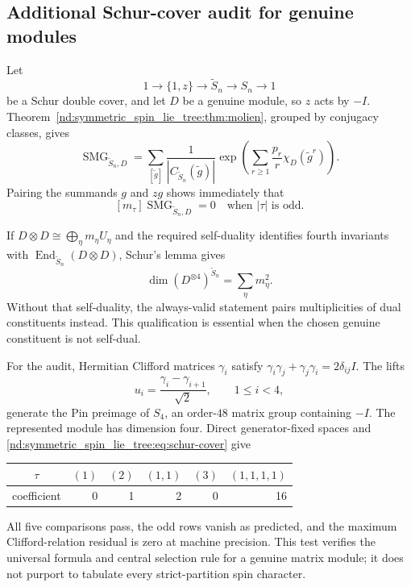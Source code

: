 \documentclass[10pt]{article}
\newcommand{\SMG}{\operatorname{SMG}}
\newcommand{\MGF}{\SMG}
\begin{document}
\subsection{Additional Schur-cover audit for genuine modules}

Let
\[
 1\longrightarrow\{1,z\}\longrightarrow\widetilde S_n
 \longrightarrow S_n\longrightarrow1
\]
be a Schur double cover, and let $D$ be a genuine module, so $z$ acts by
$-I$.  Theorem~\ref{nd:symmetric_spin_lie_tree:thm:molien}, grouped by conjugacy classes, gives
\begin{equation}\label{nd:symmetric_spin_lie_tree:eq:schur-cover}
 \boxed{
 \MGF_{\widetilde S_n,D}
 =\sum_{[\widetilde g]}
 \frac1{|C_{\widetilde S_n}(\widetilde g)|}
 \exp\!\left(\sum_{r\ge1}\frac{p_r}{r}
 \chi_D(\widetilde g^r)\right).}
\end{equation}
Pairing the summands $g$ and $zg$ shows immediately that
\begin{equation}\label{nd:symmetric_spin_lie_tree:eq:central-parity}
 \boxed{[m_\tau]\MGF_{\widetilde S_n,D}=0
 \quad\text{when }|\tau|\text{ is odd}.}
\end{equation}

If $D\otimes D\cong\bigoplus_\eta m_\eta U_\eta$ and the required
self-duality identifies fourth invariants with
$\operatorname{End}_{\widetilde S_n}(D\otimes D)$, Schur's lemma gives
\begin{equation}\label{nd:symmetric_spin_lie_tree:eq:spin-fourth}
 \dim(D^{\otimes4})^{\widetilde S_n}=\sum_\eta m_\eta^2.
\end{equation}
Without that self-duality, the always-valid statement pairs multiplicities
of dual constituents instead.  This qualification is essential when the
chosen genuine constituent is not self-dual.

For the audit, Hermitian Clifford matrices $\gamma_i$ satisfy
$\gamma_i\gamma_j+\gamma_j\gamma_i=2\delta_{ij}I$.  The lifts
\[
 u_i=\frac{\gamma_i-\gamma_{i+1}}{\sqrt2},\qquad 1\le i<4,
\]
generate the Pin preimage of $S_4$, an order-$48$ matrix group containing
$-I$.  The represented module has dimension four.  Direct generator-fixed
spaces and \eqref{nd:symmetric_spin_lie_tree:eq:schur-cover} give
\begin{center}
\begin{tabular}{@{}crrrrr@{}}\toprule
$\tau$&$(1)$&$(2)$&$(1,1)$&$(3)$&$(1,1,1,1)$\\\midrule
coefficient&0&1&2&0&16\\\bottomrule
\end{tabular}
\end{center}
All five comparisons pass, the odd rows vanish as predicted, and the maximum
Clifford-relation residual is zero at machine precision.  This test verifies
the universal formula and central selection rule for a genuine matrix module;
it does not purport to tabulate every strict-partition spin character.
\end{document}
